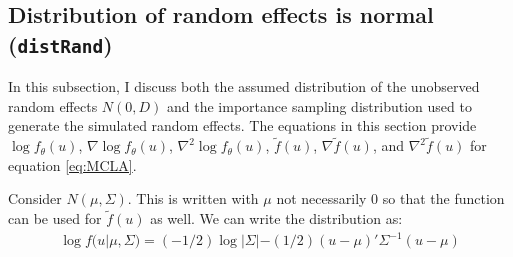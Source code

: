 \documentclass{article}
\begin{document}
 

%
%
%


\subsection{Distribution of random effects is normal (\texttt{distRand})}\label{sec:distRand}
%
%

In this subsection, I discuss both the assumed distribution of the unobserved random effects $N(0,D)$ and the importance sampling distribution used to generate the simulated random effects.  The equations in this section provide  $\log f_\theta(u)$, $\nabla \log f_\theta(u)$,  $\nabla^2 \log f_\theta(u)$, $\tilde{f}(u)$, $ \nabla \tilde{f}(u)$, and $\nabla^2 \tilde{f}(u)$  for equation \ref{eq:MCLA}. 

Consider $N(\mu, \Sigma)$.  This is written with $\mu$ not necessarily $0$ so that the function can be used for $\tilde{f}(u)$ as well.  We can  write the distribution  as:
\begin{align}
\log f (u| \mu, \Sigma) = (-1/2) \log |\Sigma| - (1/2) (u-\mu)' \Sigma^{-1} (u-\mu)
\end{align}
\end{document}
